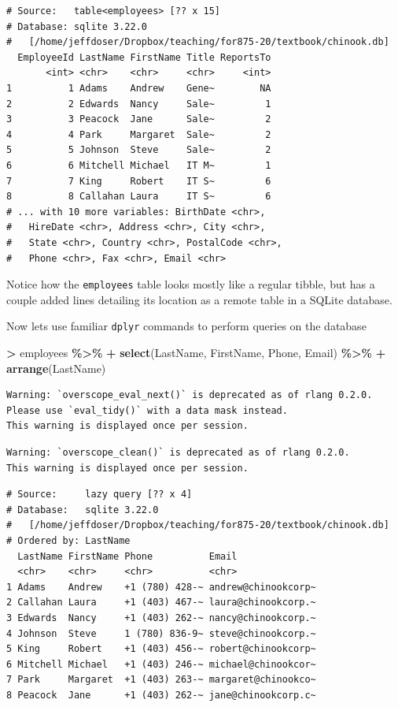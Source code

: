 \documentclass[
]{krantz}
\makeatletter
\newenvironment{Shaded}{\begin{snugshade}}{\end{snugshade}}
\newcommand{\KeywordTok}[1]{\textcolor[rgb]{0.27,0.27,0.27}{\textbf{#1}}}
\newcommand{\NormalTok}[1]{#1}
\newcommand{\OperatorTok}[1]{\textcolor[rgb]{0.43,0.43,0.43}{\textbf{#1}}}
\newcommand{\StringTok}[1]{\textcolor[rgb]{0.5,0.5,0.5}{#1}}
\newenvironment{kframe}{%
\medskip{}
\setlength{\fboxsep}{.8em}
 \def\at@end@of@kframe{}%
 \ifinner\ifhmode%
  \def\at@end@of@kframe{\end{minipage}}%
  \begin{minipage}{\columnwidth}%
 \fi\fi%
 \def\FrameCommand##1{\hskip\@totalleftmargin \hskip-\fboxsep
 \colorbox{shadecolor}{##1}\hskip-\fboxsep
     \hskip-\linewidth \hskip-\@totalleftmargin \hskip\columnwidth}%
 \MakeFramed {\advance\hsize-\width
   \@totalleftmargin\z@ \linewidth\hsize
   \@setminipage}}%
 {\par\unskip\endMakeFramed%
 \at@end@of@kframe}
\renewenvironment{Shaded}{\begin{kframe}}{\end{kframe}}
\makeatother
\begin{document}
\begin{verbatim}
# Source:   table<employees> [?? x 15]
# Database: sqlite 3.22.0
#   [/home/jeffdoser/Dropbox/teaching/for875-20/textbook/chinook.db]
  EmployeeId LastName FirstName Title ReportsTo
       <int> <chr>    <chr>     <chr>     <int>
1          1 Adams    Andrew    Gene~        NA
2          2 Edwards  Nancy     Sale~         1
3          3 Peacock  Jane      Sale~         2
4          4 Park     Margaret  Sale~         2
5          5 Johnson  Steve     Sale~         2
6          6 Mitchell Michael   IT M~         1
7          7 King     Robert    IT S~         6
8          8 Callahan Laura     IT S~         6
# ... with 10 more variables: BirthDate <chr>,
#   HireDate <chr>, Address <chr>, City <chr>,
#   State <chr>, Country <chr>, PostalCode <chr>,
#   Phone <chr>, Fax <chr>, Email <chr>
\end{verbatim}

Notice how the \texttt{employees} table looks mostly like a regular tibble, but has a couple added lines detailing its location as a remote table in a SQLite database.

Now lets use familiar \texttt{dplyr} commands to perform queries on the database

\begin{Shaded}
\begin{Highlighting}[]
\OperatorTok{\textgreater{}}\StringTok{ }\NormalTok{employees }\OperatorTok{\%\textgreater{}\%}\StringTok{ }
\OperatorTok{+}\StringTok{   }\KeywordTok{select}\NormalTok{(LastName, FirstName, Phone, Email) }\OperatorTok{\%\textgreater{}\%}\StringTok{ }
\OperatorTok{+}\StringTok{   }\KeywordTok{arrange}\NormalTok{(LastName)}
\end{Highlighting}
\end{Shaded}

\begin{verbatim}
Warning: `overscope_eval_next()` is deprecated as of rlang 0.2.0.
Please use `eval_tidy()` with a data mask instead.
This warning is displayed once per session.
\end{verbatim}

\begin{verbatim}
Warning: `overscope_clean()` is deprecated as of rlang 0.2.0.
This warning is displayed once per session.
\end{verbatim}

\begin{verbatim}
# Source:     lazy query [?? x 4]
# Database:   sqlite 3.22.0
#   [/home/jeffdoser/Dropbox/teaching/for875-20/textbook/chinook.db]
# Ordered by: LastName
  LastName FirstName Phone          Email              
  <chr>    <chr>     <chr>          <chr>              
1 Adams    Andrew    +1 (780) 428-~ andrew@chinookcorp~
2 Callahan Laura     +1 (403) 467-~ laura@chinookcorp.~
3 Edwards  Nancy     +1 (403) 262-~ nancy@chinookcorp.~
4 Johnson  Steve     1 (780) 836-9~ steve@chinookcorp.~
5 King     Robert    +1 (403) 456-~ robert@chinookcorp~
6 Mitchell Michael   +1 (403) 246-~ michael@chinookcor~
7 Park     Margaret  +1 (403) 263-~ margaret@chinookco~
8 Peacock  Jane      +1 (403) 262-~ jane@chinookcorp.c~
\end{verbatim}
\end{document}
